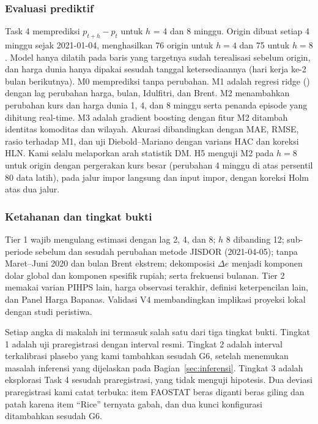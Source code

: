 \documentclass[11pt,a4paper]{article}
\makeatletter
\newcommand{\kg@one}[2]{\ifcsdef{#1@#2}{\csuse{#1@#2}}{\textbf{??#2}\PackageWarning{kagami}{Rujukan tak dikenal: #2}}}
\newcommand{\kg@item}[1]{\kg@sep\kg@one{refp}{#1}\def\kg@sep{; }}
\newcommand{\citep}[1]{\begingroup\def\kg@sep{}(\forcsvlist{\kg@item}{#1})\endgroup}
\makeatother
\begin{document}
\subsubsection{Evaluasi prediktif}
Task 4 memprediksi $p_{t+h} - p_t$ untuk $h$ = 4 dan 8 minggu. Origin dibuat setiap 4 minggu sejak 2021-01-04, menghasilkan
76 origin untuk $h=4$ dan 75 untuk $h=8$. Model hanya dilatih pada baris yang targetnya sudah terealisasi sebelum origin, dan harga
dunia hanya dipakai sesudah tanggal ketersediaannya (hari kerja ke-2 bulan berikutnya). M0 memprediksi tanpa perubahan. M1 adalah
regresi ridge \citep{hoerl1970} dengan lag perubahan harga, bulan, Idulfitri, dan Brent. M2 menambahkan perubahan kurs dan harga
dunia 1, 4, dan 8 minggu serta penanda episode yang dihitung real-time. M3 adalah gradient boosting dengan fitur M2 ditambah
identitas komoditas dan wilayah. Akurasi dibandingkan dengan MAE, RMSE, rasio terhadap M1, dan uji Diebold–Mariano dengan varians
HAC dan koreksi HLN. Kami selalu melaporkan arah statistik DM. H5 menguji M2 pada $h=8$ untuk origin dengan pergerakan kurs besar
(perubahan 4 minggu di atas persentil 80 data latih), pada jalur impor langsung dan input impor, dengan koreksi Holm atas dua jalur.

\subsubsection{Ketahanan dan tingkat bukti}
Tier 1 wajib mengulang estimasi dengan lag 2, 4, dan 8; $h$ 8 dibanding 12; sub-periode sebelum dan sesudah perubahan metode JISDOR
(2021-04-05); tanpa Maret–Juni 2020 dan bulan Brent ekstrem; dekomposisi $\Delta e$ menjadi komponen dolar global dan komponen
spesifik rupiah; serta frekuensi bulanan. Tier 2 memakai varian PIHPS lain, harga observasi terakhir, definisi keterpencilan lain,
dan Panel Harga Bapanas. Validasi V4 membandingkan implikasi proyeksi lokal dengan studi peristiwa.

Setiap angka di makalah ini termasuk salah satu dari tiga tingkat bukti. Tingkat 1 adalah uji praregistrasi dengan interval resmi.
Tingkat 2 adalah interval terkalibrasi plasebo yang kami tambahkan sesudah G6, setelah menemukan masalah inferensi yang dijelaskan
pada Bagian~\ref{sec:inferensi}. Tingkat 3 adalah eksplorasi Task 4 sesudah praregistrasi, yang tidak menguji hipotesis. Dua deviasi
praregistrasi kami catat terbuka: item FAOSTAT beras diganti beras giling dan patah karena item ``Rice'' ternyata gabah, dan dua kunci
konfigurasi ditambahkan sesudah G6.
\end{document}
